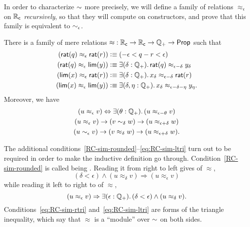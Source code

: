 In order to characterize $\mathord\sim$ more precisely, we will define a family of relations $\approx_\epsilon$ on $\mathbb{R}_\mathsf{c}$ \emph{recursively}, so that they will compute on constructors, and prove that this family is equivalent to $\sim_{\epsilon}$.

\begin{thm}\label{defn:RC-approx}
  There is a family of mere relations $\mathord\approx:\mathbb{R}_\mathsf{c}\to\mathbb{R}_\mathsf{c}\to\mathbb{Q}_{+}\to\mathsf{Prop}$ such that
  \begin{align}
    (\rcrat(q) \approx_\epsilon \rcrat(r))  &\defeq
    (-\epsilon < q - r < \epsilon)\label{eq:RCappx1}\\
    (\rcrat(q) \approx_\epsilon \rclim(y)) &\defeq
    \exis{\delta : \Qp} \rcrat(q) \approx_{\epsilon - \delta} y_\delta\label{eq:RCappx2}\\
    (\rclim(x) \approx_\epsilon \rcrat(r)) &\defeq
    \exis{\delta : \Qp} x_\delta \approx_{\epsilon - \delta} \rcrat(r)\label{eq:RCappx3}\\
    (\rclim(x) \approx_\epsilon \rclim(y)) &\defeq
    \exis{\delta, \eta : \Qp} x_\delta \approx_{\epsilon - \delta - \eta} y_\eta.\label{eq:RCappx4}
  \end{align}
  Moreover, we have
  \begin{gather}
    (u \approx_\epsilon v) \Leftrightarrow \exis{\theta:\Qp} (u \approx_{\epsilon-\theta} v) \label{RC-sim-rounded}\\
    (u \approx_\epsilon v) \to (v\close\delta w) \to (u\approx_{\epsilon+\delta} w)\label{eq:RC-sim-rtri}\\ 
    (u \close\epsilon v) \to (v\approx_\delta w) \to (u\approx_{\epsilon+\delta} w)\label{eq:RC-sim-ltri}.
  \end{gather}
\end{thm}

The additional conditions~\eqref{RC-sim-rounded}--\eqref{eq:RC-sim-ltri} turn out to be required in order to make the inductive definition go through.
Condition~\eqref{RC-sim-rounded} is called being .
Reading it from right to left gives  of $\approx$,
%
\begin{equation*}
  (\delta < \epsilon) \land (u \approx_\delta v) \Rightarrow (u \approx_\epsilon v)
\end{equation*}
%
while reading it left to right to  of $\approx$,
%
\begin{equation*}
  (u \approx_\epsilon v) \Rightarrow \exis{\epsilon : \Qp} (\delta < \epsilon) \land (u \approx_\delta v).
\end{equation*}
%
Conditions~\eqref{eq:RC-sim-rtri} and~\eqref{eq:RC-sim-ltri} are forms of the triangle inequality, which say that $\approx$ is a ``module'' over $\mathord\sim$ on both sides.


